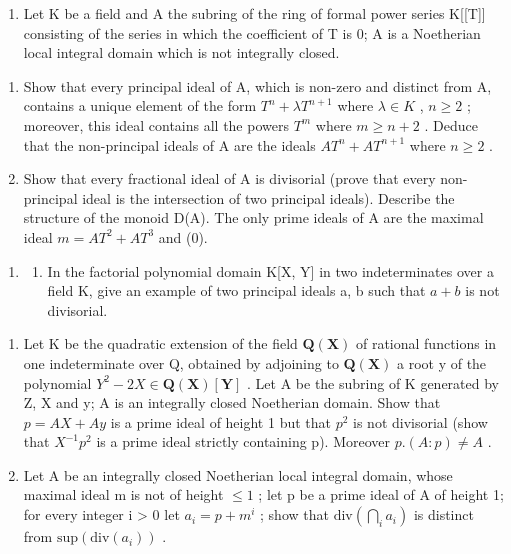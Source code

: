 
\begin{enumerate}
\def\labelenumi{\arabic{enumi}.}
\tightlist
\item
  Let K be a field and A the subring of the ring of formal power series K{[}{[}T{]}{]} consisting of the series in which the coefficient of T is 0; A is a Noetherian local integral domain which is not integrally closed.
\end{enumerate}

\begin{enumerate}
\def\labelenumi{(\alph{enumi})}
\item
  Show that every principal ideal of A, which is non-zero and distinct from A, contains a unique element of the form \(T^{n} + \lambda T^{n+1}\) where \(\lambda \in K\) , \(n \geqslant 2\) ; moreover, this ideal contains all the powers \(T^{m}\) where \(m \geqslant n + 2\) . Deduce that the non-principal ideals of A are the ideals \(AT^{n} + AT^{n+1}\) where \(n \geqslant 2\) .
\item
  Show that every fractional ideal of A is divisorial (prove that every non-principal ideal is the intersection of two principal ideals). Describe the structure of the monoid D(A). The only prime ideals of A are the maximal ideal \(m = AT^{2} + AT^{3}\) and (0).
\end{enumerate}

\begin{enumerate}
\def\labelenumi{\arabic{enumi}.}
\setcounter{enumi}{1}
\tightlist
\item
  \begin{enumerate}
  \def\labelenumii{(\alph{enumii})}
  \tightlist
  \item
    In the factorial polynomial domain K{[}X, Y{]} in two indeterminates over a field K, give an example of two principal ideals a, b such that \(a + b\) is not divisorial.
  \end{enumerate}
\end{enumerate}

\begin{enumerate}
\def\labelenumi{(\alph{enumi})}
\setcounter{enumi}{1}
\item
  Let K be the quadratic extension of the field \(\mathbf{Q}(\mathbf{X})\) of rational functions in one indeterminate over Q, obtained by adjoining to \(\mathbf{Q}(\mathbf{X})\) a root y of the polynomial \(Y^{2}-2X\in\mathbf{Q}(\mathbf{X})[\mathbf{Y}]\) . Let A be the subring of K generated by Z, X and y; A is an integrally closed Noetherian domain. Show that \(p=AX+Ay\) is a prime ideal of height 1 but that \(p^{2}\) is not divisorial (show that \(X^{-1}p^{2}\) is a prime ideal strictly containing p). Moreover \(p.(A:p)\neq A\) .
\item
  Let A be an integrally closed Noetherian local integral domain, whose maximal ideal m is not of height \(\leqslant1\) ; let p be a prime ideal of A of height 1; for every integer i \textgreater{} 0 let \(a_{i} = p + m^{i}\) ; show that \(\text{div}\left(\bigcap_{i} a_{i}\right)\) is distinct from \(\text{sup}(\text{div}(a_{i}))\) .
\end{enumerate}

